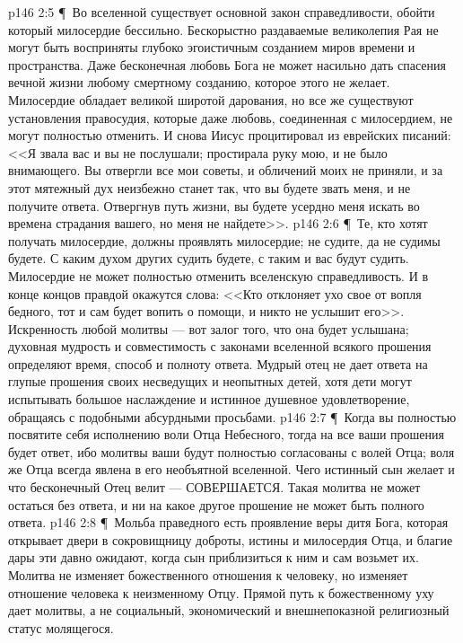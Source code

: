 \vs p146 2:5 \P\ \bibnobreakspace Во вселенной существует основной закон справедливости, обойти который милосердие бессильно. Бескорыстно раздаваемые великолепия Рая не могут быть восприняты глубоко эгоистичным созданием миров времени и пространства. Даже бесконечная любовь Бога не может насильно дать спасения вечной жизни любому смертному созданию, которое этого не желает. Милосердие обладает великой широтой дарования, но все же существуют установления правосудия, которые даже любовь, соединенная с милосердием, не могут полностью отменить. И снова Иисус процитировал из еврейских писаний: <<Я звала вас и вы не послушали; простирала руку мою, и не было внимающего. Вы отвергли все мои советы, и обличений моих не приняли, и за этот мятежный дух неизбежно станет так, что вы будете звать меня, и не получите ответа. Отвергнув путь жизни, вы будете усердно меня искать во времена страдания вашего, но меня не найдете>>.
\vs p146 2:6 \P\ \bibnobreakspace Те, кто хотят получать милосердие, должны проявлять милосердие; не судите, да не судимы будете. С каким духом других судить будете, с таким и вас будут судить. Милосердие не может полностью отменить вселенскую справедливость. И в конце концов правдой окажутся слова: <<Кто отклоняет ухо свое от вопля бедного, тот и сам будет вопить о помощи, и никто не услышит его>>. Искренность любой молитвы --- вот залог того, что она будет услышана; духовная мудрость и совместимость с законами вселенной всякого прошения определяют время, способ и полноту ответа. Мудрый отец не дает  ответа на глупые прошения своих несведущих и неопытных детей, хотя дети могут испытывать большое наслаждение и истинное душевное удовлетворение, обращаясь с подобными абсурдными просьбами.
\vs p146 2:7 \P\ \bibnobreakspace Когда вы полностью посвятите себя исполнению воли Отца Небесного, тогда на все ваши прошения будет ответ, ибо молитвы ваши будут полностью согласованы с волей Отца; воля же Отца всегда явлена в его необъятной вселенной. Чего истинный сын желает и что бесконечный Отец велит --- СОВЕРШАЕТСЯ. Такая молитва не может остаться без ответа, и ни на какое другое прошение не может быть полного ответа.
\vs p146 2:8 \P\ \bibnobreakspace Мольба праведного есть проявление веры дитя Бога, которая открывает двери в сокровищницу доброты, истины и милосердия Отца, и благие дары эти давно ожидают, когда сын приблизиться к ним и сам возьмет их. Молитва не изменяет божественного отношения к человеку, но изменяет отношение человека к неизменному Отцу. Прямой путь к божественному уху дает  молитвы, а не социальный, экономический и внешнепоказной религиозный статус молящегося.
